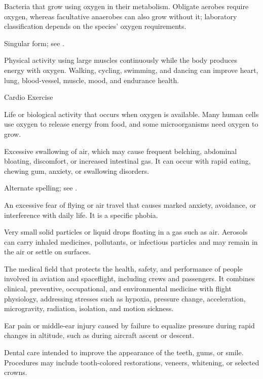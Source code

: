  Bacteria that grow using oxygen in their metabolism. Obligate aerobes require oxygen, whereas facultative anaerobes can also grow without it; laboratory classification depends on the species’ oxygen requirements.

 Singular form; see .

 Physical activity using large muscles continuously while the body produces energy with oxygen. Walking, cycling, swimming, and dancing can improve heart, lung, blood-vessel, muscle, mood, and endurance health.

\synonyms
Cardio Exercise

 Life or biological activity that occurs when oxygen is available. Many human cells use oxygen to release energy from food, and some microorganisms need oxygen to grow.

 Excessive swallowing of air, which may cause frequent belching, abdominal bloating, discomfort, or increased intestinal gas. It can occur with rapid eating, chewing gum, anxiety, or swallowing disorders.

 Alternate spelling; see .

 An excessive fear of flying or air travel that causes
marked anxiety, avoidance, or interference with daily life. It is a specific
phobia.

 Very small solid particles or liquid drops floating in a gas such as air. Aerosols can carry inhaled medicines, pollutants, or infectious particles and may remain in the air or settle on surfaces.

 The medical field that protects the health, safety, and performance of people involved in aviation and spaceflight, including crews and passengers.
It combines clinical, preventive, occupational, and environmental medicine
with flight physiology, addressing stresses such as hypoxia, pressure change,
acceleration, microgravity, radiation, isolation, and motion sickness.

 Ear pain or middle-ear injury caused by failure to equalize pressure during rapid changes in altitude, such as during aircraft ascent or descent.

 Dental care intended to improve the appearance of the teeth, gums, or smile. Procedures may include
tooth-colored restorations, veneers, whitening, or selected crowns.

